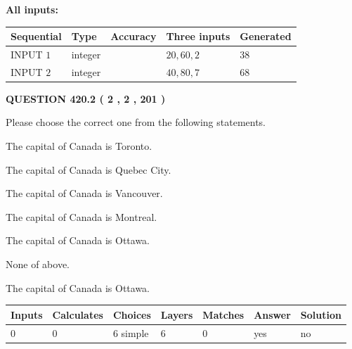\documentclass[12pt]{article}
\begin{document}
   
   
   
\noindent\vspace{0.1in}\hspace{-0.08in} {\textbf{\Large{All inputs: }}}
   
   
  
  
\noindent\begin{tabular}{|l|l|l|l|l|}
\hline
 Sequential & Type & Accuracy & Three inputs & Generated \\ 
\hline
 
 
  INPUT $  1 $ & integer &  & $
 20
 , 
 60
 , 
 2
 $ & $ 38 $ 
 \\  \hline  
 
 
  INPUT $  2 $ & integer &  & $
 40
 , 
 80
 , 
 7
 $ & $ 68 $ 
 \\  \hline  
 \end{tabular}
   
   
  
\vspace{0.2in}
  
{\textbf{\Large{QUESTION
420.2 
 ( 2 , 2 , 201 )
}}}
  
  
Please choose the correct one from the following statements.
 
 
The capital of Canada is Toronto.
 
 
The capital of Canada is Quebec City.
 
 
The capital of Canada is Vancouver.
 
 
The capital of Canada is Montreal.
 
 
The capital of Canada is Ottawa.
 
 
 None of above.
 
 
\noindent{}
 
 
The capital of Canada is Ottawa.
 
 
\noindent{}
 
 
   
   
   
   
\noindent\begin{tabular}{|l|l|l|l|l|l|l|}
 \hline
Inputs & Calculates & Choices & Layers & Matches & Answer & Solution \\ \hline
 0  & 
 0  & 
 6
  simple  
  & 
 6  & 
 0  & 
  yes & 
  no 
  \\ \hline
 \end{tabular}
   
\end{document}
